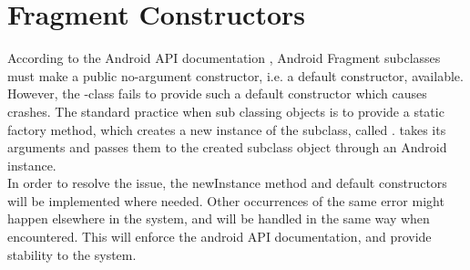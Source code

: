 
\section{Fragment Constructors}
\label{sec:fragment_constructors}

According to the Android API documentation \parencite{android_dev_fragment}, Android Fragment subclasses must make a public no-argument constructor, i.e. a default constructor, available. However, the \giraf-class  fails to provide such a default constructor which causes crashes. The standard practice when sub classing  objects is to provide a static factory method, which creates a new instance of the  subclass, called .  takes its arguments and passes them to the created  subclass object through an Android  instance. \\

In order to resolve the issue, the newInstance method and default constructors will be implemented where needed. Other occurrences of the same error might happen elsewhere in the system, and will be handled in the same way when encountered. This will enforce the android API documentation, and provide stability to the system. 